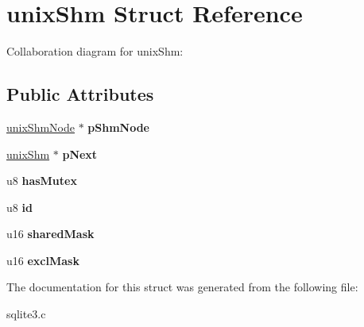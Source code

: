 \hypertarget{structunixShm}{}\section{unix\+Shm Struct Reference}
\label{structunixShm}


Collaboration diagram for unix\+Shm\+:
\subsection*{Public Attributes}
\begin{DoxyCompactItemize}
\item 
\hyperlink{structunixShmNode}{unix\+Shm\+Node} $\ast$ {\bfseries p\+Shm\+Node}\hypertarget{structunixShm_a8ab421232d29e3237262ef46775199ee}{}\label{structunixShm_a8ab421232d29e3237262ef46775199ee}

\item 
\hyperlink{structunixShm}{unix\+Shm} $\ast$ {\bfseries p\+Next}\hypertarget{structunixShm_a0d5229cf734581f51cdf16dd7d5ce93a}{}\label{structunixShm_a0d5229cf734581f51cdf16dd7d5ce93a}

\item 
u8 {\bfseries has\+Mutex}\hypertarget{structunixShm_a43903be262472299c5eee917ba7c523c}{}\label{structunixShm_a43903be262472299c5eee917ba7c523c}

\item 
u8 {\bfseries id}\hypertarget{structunixShm_a88a5e7161ff31f85740dbfc0ba7ad38a}{}\label{structunixShm_a88a5e7161ff31f85740dbfc0ba7ad38a}

\item 
u16 {\bfseries shared\+Mask}\hypertarget{structunixShm_a768aa62a6ea2bd91ab60a34d7654811b}{}\label{structunixShm_a768aa62a6ea2bd91ab60a34d7654811b}

\item 
u16 {\bfseries excl\+Mask}\hypertarget{structunixShm_ac6f786d95952e51cab941cbfb9243c8e}{}\label{structunixShm_ac6f786d95952e51cab941cbfb9243c8e}

\end{DoxyCompactItemize}


The documentation for this struct was generated from the following file\+:\begin{DoxyCompactItemize}
\item 
sqlite3.\+c\end{DoxyCompactItemize}
